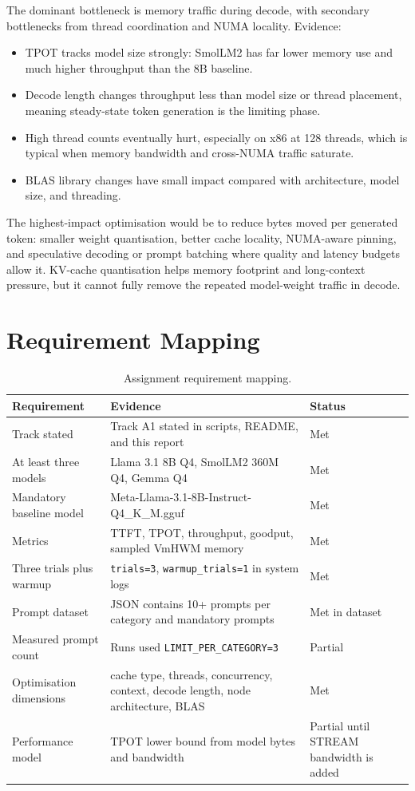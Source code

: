 \documentclass[11pt,a4paper]{article}
\begin{document}
The dominant bottleneck is memory traffic during decode, with secondary
bottlenecks from thread coordination and NUMA locality. Evidence:
\begin{itemize}
\item TPOT tracks model size strongly: SmolLM2 has far lower memory use and much higher throughput than the 8B baseline.
\item Decode length changes throughput less than model size or thread placement, meaning steady-state token generation is the limiting phase.
\item High thread counts eventually hurt, especially on x86 at 128 threads, which is typical when memory bandwidth and cross-NUMA traffic saturate.
\item BLAS library changes have small impact compared with architecture, model size, and threading.
\end{itemize}

The highest-impact optimisation would be to reduce bytes moved per generated
token: smaller weight quantisation, better cache locality, NUMA-aware pinning,
and speculative decoding or prompt batching where quality and latency budgets
allow it. KV-cache quantisation helps memory footprint and long-context
pressure, but it cannot fully remove the repeated model-weight traffic in
decode.

\section{Requirement Mapping}

\begin{table}[htbp]
\centering
\small
\begin{tabular}{lll}
\hline
Requirement & Evidence & Status \\
\hline
Track stated & Track A1 stated in scripts, README, and this report & Met \\
At least three models & Llama 3.1 8B Q4, SmolLM2 360M Q4, Gemma Q4 & Met \\
Mandatory baseline model & Meta-Llama-3.1-8B-Instruct-Q4\_K\_M.gguf & Met \\
Metrics & TTFT, TPOT, throughput, goodput, sampled VmHWM memory & Met \\
Three trials plus warmup & \texttt{trials=3}, \texttt{warmup\_trials=1} in system logs & Met \\
Prompt dataset & JSON contains 10+ prompts per category and mandatory prompts & Met in dataset \\
Measured prompt count & Runs used \texttt{LIMIT\_PER\_CATEGORY=3} & Partial \\
Optimisation dimensions & cache type, threads, concurrency, context, decode length, node architecture, BLAS & Met \\
Performance model & TPOT lower bound from model bytes and bandwidth & Partial until STREAM bandwidth is added \\
\hline
\end{tabular}
\caption{Assignment requirement mapping.}
\label{tab:requirements}
\end{table}
\end{document}
